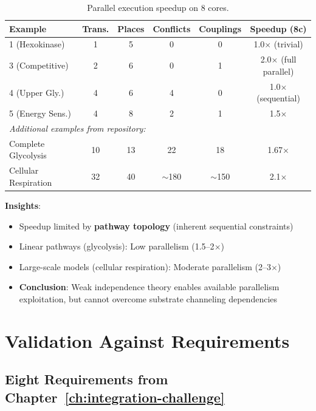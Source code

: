 \begin{table}[htbp]
\centering
\caption{Parallel execution speedup on 8 cores.}
\label{tab:scalability}
\begin{tabular}{lccccc}
\toprule
\textbf{Example} & \textbf{Trans.} & \textbf{Places} & \textbf{Conflicts} & \textbf{Couplings} & \textbf{Speedup (8c)} \\
\midrule
1 (Hexokinase)     & 1  & 5  & 0  & 0  & 1.0$\times$ (trivial) \\
3 (Competitive)    & 2  & 6  & 0  & 1  & 2.0$\times$ (full parallel) \\
4 (Upper Gly.)     & 4  & 6  & 4  & 0  & 1.0$\times$ (sequential) \\
5 (Energy Sens.)   & 4  & 8  & 2  & 1  & 1.5$\times$ \\
\midrule
\multicolumn{6}{l}{\textit{Additional examples from repository:}} \\
Complete Glycolysis & 10 & 13 & 22 & 18 & 1.67$\times$ \\
Cellular Respiration & 32 & 40 & $\sim$180 & $\sim$150 & 2.1$\times$ \\
\bottomrule
\end{tabular}
\end{table}

\textbf{Insights}:

\begin{itemize}
    \item Speedup limited by \textbf{pathway topology} (inherent sequential constraints)
    \item Linear pathways (glycolysis): Low parallelism (1.5--2$\times$)
    \item Large-scale models (cellular respiration): Moderate parallelism (2--3$\times$)
    \item \textbf{Conclusion}: Weak independence theory enables available parallelism exploitation, but cannot overcome substrate channeling dependencies
\end{itemize}

\section{Validation Against Requirements}
\label{sec:requirements-validation}

\subsection{Eight Requirements from Chapter~\ref{ch:integration-challenge}}
\label{subsec:requirements-check}

